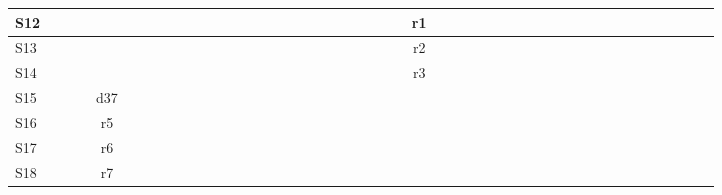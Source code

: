 \documentclass[a4paper, 12pt]{article}
\begin{document}
\begin{table}[htbp]
\begin{turn}{90}
{\begin{tabular}{|l|c|c|c|c|c|c|c|c|c|c|c|c|c|c|c|c|c|c|c|c|c|c|c|c|c||c|c|c|c|c|c|c|c|c|c|c|c|c|c|c|c|c|c|c|c|}
    \midrule
    S12   &       &       &       &       &       &       &       &       &       &       &       &       &       &       &       &       &       &       &       &       &       &       &       &       & r1    &       &       &       &       &       &       &       &       &       &       &       &       &       &       &       &       &       &       &       &  \\
    \midrule
    S13   &       &       &       &       &       &       &       &       &       &       &       &       &       &       &       &       &       &       &       &       &       &       &       &       & r2    &       &       &       &       &       &       &       &       &       &       &       &       &       &       &       &       &       &       &       &  \\
    \midrule
    S14   &       &       &       &       &       &       &       &       &       &       &       &       &       &       &       &       &       &       &       &       &       &       &       &       & r3    &       &       &       &       &       &       &       &       &       &       &       &       &       &       &       &       &       &       &       &  \\
    \midrule
    S15   &       &       &       & d37   &       &       &       &       &       &       &       &       &       &       &       &       &       &       &       &       &       &       &       &       &       &       &       &       &       &       &       &       &       &       &       &       &       &       &       &       &       &       &       &       &  \\
    \midrule
    S16   &       &       &       & r5    &       &       &       &       &       &       &       &       &       &       &       &       &       &       &       &       &       &       &       &       &       &       &       &       &       &       &       &       &       &       &       &       &       &       &       &       &       &       &       &       &  \\
    \midrule
    S17   &       &       &       & r6    &       &       &       &       &       &       &       &       &       &       &       &       &       &       &       &       &       &       &       &       &       &       &       &       &       &       &       &       &       &       &       &       &       &       &       &       &       &       &       &       &  \\
    \midrule
    S18   &       &       &       & r7    &       &       &       &       &       &       &       &       &       &       &       &       &       &       &       &       &       &       &       &       &       &       &       &       &       &       &       &       &       &       &       &       &       &       &       &       &       &       &       &       &  \\

\end{tabular}}
\end{turn}
\end{table}
\end{document}
